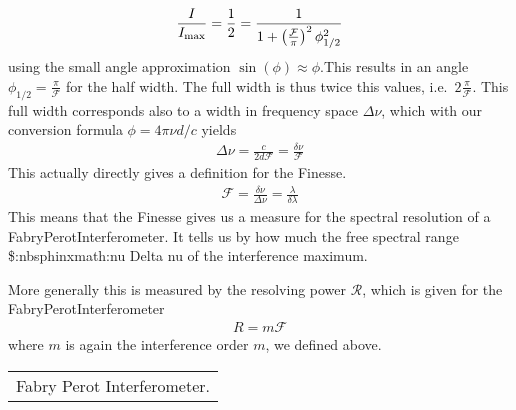 \documentclass[letterpaper,10pt,english]{sphinxmanual}
\begin{document}
\begin{equation*}
\begin{split}\frac{I}{I_{\rm max}}=\frac{1}{2}=\frac{1}{1+\left( \frac{\mathcal{F}}{\pi}\right )^2\phi^{2}_{1/2} }\end{split}
\end{equation*}
using the small angle approximation \(\sin(\phi)\approx\phi\).This results in an angle \(\phi_{1/2}= \frac{\pi}{\mathcal{F}}\) for the half width. The full width is thus twice this values, i.e. \(2\frac{\pi}{\mathcal{F}}\). This full width corresponds also to a width in frequency space \(\Delta \nu\), which with our conversion formula \(\phi=4\pi\nu d/c\) yields
\begin{equation*}
\begin{split}\Delta \nu=\frac{c}{2d\mathcal{F}}=\frac{\delta \nu}{\mathcal{F}}\end{split}
\end{equation*}
This actually directly gives a definition for the Finesse.
\begin{equation*}
\begin{split}\mathcal{F}=\frac{\delta \nu}{\Delta \nu}=\frac{\lambda}{\delta \lambda}\end{split}
\end{equation*}
This means that the Finesse gives us a measure for the spectral resolution of a Fabry\sphinxhyphen{}Perot\sphinxhyphen{}Interferometer. It tells us by how much the free spectral range \$:nbsphinx\sphinxhyphen{}math:nu Delta nu\textasciigrave{} of the interference maximum.

More generally this is measured by the resolving power \(\mathcal{R}\), which is given for the Fabry\sphinxhyphen{}Perot\sphinxhyphen{}Interferometer
\begin{equation*}
\begin{split}R=m\mathcal{F}\end{split}
\end{equation*}
where \(m\) is again the interference order \(m\), we defined above.


\begin{savenotes}\sphinxattablestart
\centering
\begin{tabulary}{\linewidth}[t]{|T|}
\hline
\sphinxstyletheadfamily 
{}
\\
\hline
{} Fabry Perot Interferometer.
\\
\hline
\end{tabulary}
\par
\sphinxattableend\end{savenotes}
\end{document}
